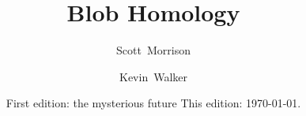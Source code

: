 \title{Blob Homology}

\author{Scott~Morrison}
\address{
}%
 

\author{Kevin~Walker}
\address{
}%
 


\date{
  First edition: the mysterious future
  This edition: \today.
}


